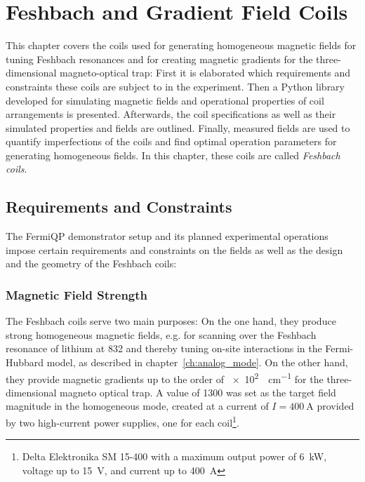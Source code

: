 \renewcommand{\imagepath}{../40-coils/img}

\chapter{Feshbach and Gradient Field Coils}\label{ch:coils}
This chapter covers the coils used for generating homogeneous magnetic fields for tuning Feshbach resonances and for creating magnetic gradients for the three-dimensional magneto-optical trap: First it is elaborated which requirements and constraints these coils are subject to in the experiment. Then a Python library developed for simulating magnetic fields and operational properties of coil arrangements is presented. Afterwards, the coil specifications as well as their simulated properties and fields are outlined. Finally, measured fields are used to quantify imperfections of the coils and find optimal operation parameters for generating homogeneous fields. In this chapter, these coils are called \textit{Feshbach coils}.

\section{Requirements and Constraints}
The FermiQP demonstrator setup and its planned experimental operations impose certain requirements and constraints on the fields as well as the design  and the geometry of the Feshbach coils:

\subsection*{Magnetic Field Strength}
The Feshbach coils serve two main purposes: On the one hand, they produce strong homogeneous magnetic fields, e.g. for scanning over the Feshbach resonance of lithium at \SI{832}{\gauss} and thereby tuning on-site interactions in the Fermi-Hubbard model, as described in chapter~\ref{ch:analog_mode}. On the other hand, they provide magnetic gradients up to the order of \SI[]{e2}{\gauss\per\centi\meter} for the three-dimensional magneto optical trap. A value of \SI{1300}{\gauss} was set as the target field magnitude in the homogeneous mode, created at a current of $I = \SI{400}{\ampere}$ provided by two high-current power supplies, one for each coil\footnote{Delta Elektronika SM 15-400 with a maximum output power of \SI[]{6}{\kilo\watt}, voltage up to \SI[]{15}{\volt}, and current up to \SI[]{400}{\ampere}}.

